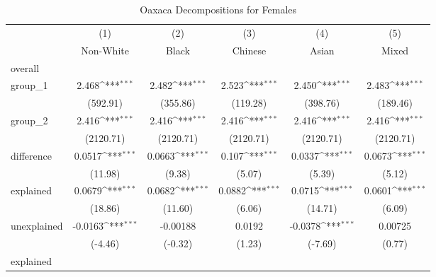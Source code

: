 {
\def\sym#1{\ifmmode^{#1}\else\(^{#1}\)\fi}
\begin{longtable}{l*{5}{c}}
\caption{Oaxaca Decompositions for Females\label{tab1}}\\
\hline\hline\endfirsthead\hline\endhead\hline\endfoot\endlastfoot
            &\multicolumn{1}{c}{(1)}&\multicolumn{1}{c}{(2)}&\multicolumn{1}{c}{(3)}&\multicolumn{1}{c}{(4)}&\multicolumn{1}{c}{(5)}\\
            &\multicolumn{1}{c}{Non-White}&\multicolumn{1}{c}{Black}&\multicolumn{1}{c}{Chinese}&\multicolumn{1}{c}{Asian}&\multicolumn{1}{c}{Mixed}\\
\hline
overall     &                     &                     &                     &                     &                     \\
group\_1     &       2.468\sym{***}&       2.482\sym{***}&       2.523\sym{***}&       2.450\sym{***}&       2.483\sym{***}\\
            &    (592.91)         &    (355.86)         &    (119.28)         &    (398.76)         &    (189.46)         \\
group\_2     &       2.416\sym{***}&       2.416\sym{***}&       2.416\sym{***}&       2.416\sym{***}&       2.416\sym{***}\\
            &   (2120.71)         &   (2120.71)         &   (2120.71)         &   (2120.71)         &   (2120.71)         \\
difference  &      0.0517\sym{***}&      0.0663\sym{***}&       0.107\sym{***}&      0.0337\sym{***}&      0.0673\sym{***}\\
            &     (11.98)         &      (9.38)         &      (5.07)         &      (5.39)         &      (5.12)         \\
explained   &      0.0679\sym{***}&      0.0682\sym{***}&      0.0882\sym{***}&      0.0715\sym{***}&      0.0601\sym{***}\\
            &     (18.86)         &     (11.60)         &      (6.06)         &     (14.71)         &      (6.09)         \\
unexplained &     -0.0163\sym{***}&    -0.00188         &      0.0192         &     -0.0378\sym{***}&     0.00725         \\
            &     (-4.46)         &     (-0.32)         &      (1.23)         &     (-7.69)         &      (0.77)         \\
\hline
explained   &                     &                     &                     &                     &                     \\

\end{longtable}}
